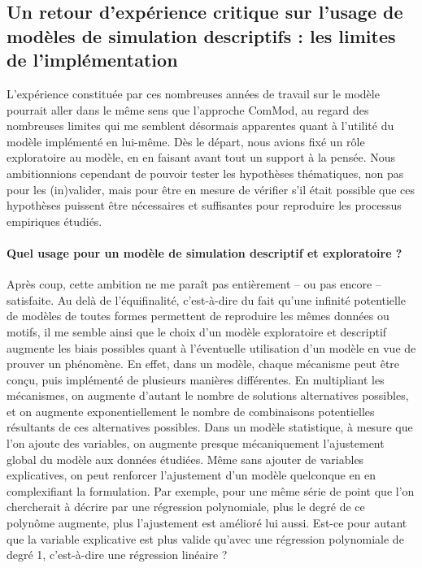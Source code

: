 \subsection{Un retour d'expérience critique sur l'usage de modèles de simulation descriptifs : les limites de l'implémentation}

L'expérience constituée par ces nombreuses années de travail sur le modèle \simfeodal{} pourrait aller dans le même sens que l'approche ComMod, au regard des nombreuses limites qui me semblent désormais apparentes quant à l'utilité du modèle implémenté en lui-même.
Dès le départ, nous avions fixé un rôle exploratoire au modèle, en en faisant avant tout un support à la pensée.
Nous ambitionnions cependant de pouvoir tester les hypothèses thématiques, non pas pour les (in)valider, mais pour être en mesure de vérifier s'il était possible que ces hypothèses puissent être nécessaires et suffisantes pour reproduire les processus empiriques étudiés.

\paragraph{Quel usage pour un modèle de simulation descriptif et exploratoire ?}

Après coup, cette ambition ne me paraît pas entièrement -- ou pas encore -- satisfaite.
Au delà de l'équifinalité, c'est-à-dire du fait qu'une infinité potentielle de modèles de toutes formes permettent de reproduire les mêmes données ou motifs, il me semble ainsi que le choix d'un modèle exploratoire et descriptif augmente les biais possibles quant à l'éventuelle utilisation d'un modèle en vue de prouver un phénomène.
En effet, dans un modèle, chaque mécanisme peut être conçu, puis implémenté de plusieurs manières différentes.
En multipliant les mécanismes, on augmente d'autant le nombre de solutions alternatives possibles, et on augmente exponentiellement le nombre de combinaisons potentielles résultants de ces alternatives possibles.
Dans un modèle statistique, à mesure que l'on ajoute des variables, on augmente presque mécaniquement l'ajustement global du modèle aux données étudiées.
Même sans ajouter de variables explicatives, on peut renforcer l'ajustement d'un modèle quelconque en en complexifiant la formulation.
Par exemple, pour une même série de point que l'on chercherait à décrire par une régression polynomiale, plus le degré de ce polynôme augmente, plus l'ajustement est amélioré lui aussi.
Est-ce pour autant que la variable explicative est plus valide qu'avec une régression polynomiale de degré 1, c'est-à-dire une régression linéaire ?

